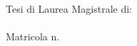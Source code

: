 \begin{titlepage}
\begin{center}
        \vfill  
        
        \flushright
        \small{Tesi di Laurea Magistrale di:}\\ %
        \medskip \spacedlowsmallcaps{\myFirstAuthorName}\\
		Matricola n. \myMatrFirstAuthor \\ 
				
		\vfill 

		\centering {\myAcademicYear}                     

    \end{center}
\end{titlepage}